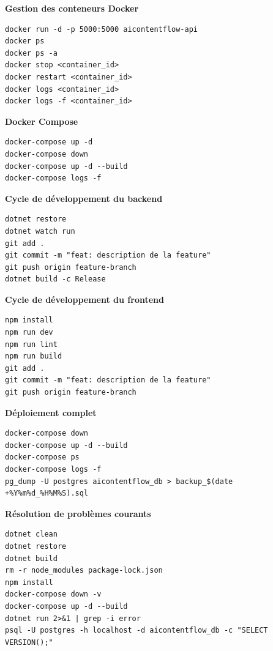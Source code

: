 \vspace{0.3cm}

\textbf{Gestion des conteneurs Docker}

\begin{verbatim}
docker run -d -p 5000:5000 aicontentflow-api
docker ps
docker ps -a
docker stop <container_id>
docker restart <container_id>
docker logs <container_id>
docker logs -f <container_id>
\end{verbatim}

\vspace{0.3cm}

\textbf{Docker Compose}

\begin{verbatim}
docker-compose up -d
docker-compose down
docker-compose up -d --build
docker-compose logs -f
\end{verbatim}

\vspace{0.5cm}

\textbf{Cycle de développement du backend}

\begin{verbatim}
dotnet restore
dotnet watch run
git add .
git commit -m "feat: description de la feature"
git push origin feature-branch
dotnet build -c Release
\end{verbatim}

\vspace{0.3cm}

\textbf{Cycle de développement du frontend}

\begin{verbatim}
npm install
npm run dev
npm run lint
npm run build
git add .
git commit -m "feat: description de la feature"
git push origin feature-branch
\end{verbatim}

\vspace{0.3cm}

\textbf{Déploiement complet}

\begin{verbatim}
docker-compose down
docker-compose up -d --build
docker-compose ps
docker-compose logs -f
pg_dump -U postgres aicontentflow_db > backup_$(date +%Y%m%d_%H%M%S).sql
\end{verbatim}

\vspace{0.3cm}

\textbf{Résolution de problèmes courants}

\begin{verbatim}
dotnet clean
dotnet restore
dotnet build
rm -r node_modules package-lock.json
npm install
docker-compose down -v
docker-compose up -d --build
dotnet run 2>&1 | grep -i error
psql -U postgres -h localhost -d aicontentflow_db -c "SELECT VERSION();"
\end{verbatim}

